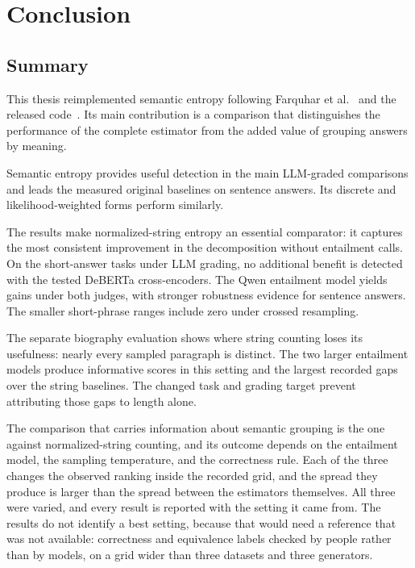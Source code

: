 \chapter{Conclusion}
\label{ch:conclusion}

\section{Summary}
\label{sec:conclusion-summary}

This thesis reimplemented semantic entropy following Farquhar et
al.~\cite{semantic_entropy_nature_2024} and the released
code~\cite{kossen_semantic_uncertainty_code_2024}. Its main contribution is a
comparison that distinguishes the performance of the complete estimator from
the added value of grouping answers by meaning.

Semantic entropy provides useful detection in the main LLM-graded comparisons
and leads the measured original baselines on sentence answers. Its discrete
and likelihood-weighted forms perform similarly.

The results make normalized-string entropy an essential comparator: it captures
the most consistent improvement in the decomposition without entailment calls.
On the short-answer tasks under LLM grading, no additional benefit is detected
with the tested DeBERTa cross-encoders. The Qwen entailment model yields gains
under both judges, with stronger robustness evidence for sentence answers.
The smaller short-phrase ranges include zero under crossed resampling.

The separate biography evaluation shows where string counting loses its
usefulness: nearly every sampled paragraph is distinct. The two larger
entailment models produce informative scores in this setting and the largest
recorded gaps over the string baselines. The changed task and grading target
prevent attributing those gaps to length alone.

The comparison that carries information about semantic grouping is the one
against normalized-string counting, and its outcome depends on the entailment
model, the sampling temperature, and the correctness rule. Each of the three
changes the observed ranking inside the recorded grid, and the spread they
produce is larger than the spread between the estimators themselves. All three
were varied, and every result is reported with the setting it came from. The
results do not identify a best setting, because that would need a reference
that was not available: correctness and equivalence labels checked by people rather than
by models, on a grid wider than three datasets and three generators.

